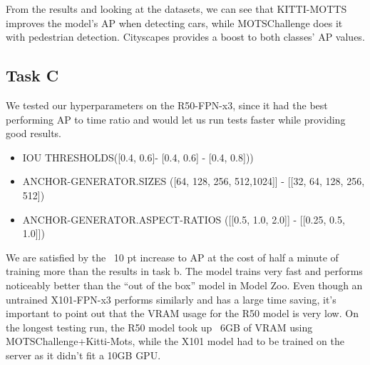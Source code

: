 \documentclass[12pt,a4paper,twocolumn,twoside]{article}
\begin{document}
From the results and looking at the datasets, we can see that KITTI-MOTTS improves the model's AP when detecting cars, while MOTSChallenge does it with pedestrian detection. Cityscapes provides a boost to both classes' AP values. 
\subsection{Task C}
We tested our hyperparameters on the R50-FPN-x3, since it had the best performing AP to time ratio and would let us run tests faster while providing good results.
\begin{itemize}
    \item IOU THRESHOLDS([0.4, 0.6]- [0.4, 0.6] - [0.4, 0.8]))
    \item ANCHOR-GENERATOR.SIZES ([64, 128, 256, 512,1024]] - [[32, 64, 128, 256, 512])
    \item ANCHOR-GENERATOR.ASPECT-RATIOS ([[0.5, 1.0, 2.0]] - [[0.25, 0.5, 1.0]])
\end{itemize}
We are satisfied by the ~10 pt increase to AP at the cost of half a minute of training more than the results in task b. The model trains very fast and performs noticeably better than the “out of the box” model in Model Zoo. Even though an untrained X101-FPN-x3 performs similarly and has a large time saving, it’s important to point out that the VRAM usage for the R50 model is very low. On the longest testing run, the R50 model took up ~6GB of VRAM using MOTSChallenge+Kitti-Mots, while the X101 model had to be trained on the server as it didn’t fit a 10GB GPU.  \newpage
  
\end{document}
